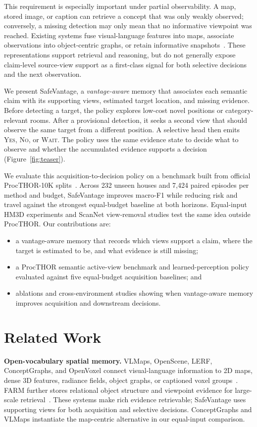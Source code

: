 \documentclass{article}
\newcommand{\method}{SafeVantage}
\begin{document}
This requirement is especially important under partial observability. A map, stored image, or caption can retrieve a concept that was only weakly observed; conversely, a missing detection may only mean that no informative viewpoint was reached. Existing systems fuse visual-language features into maps, associate observations into object-centric graphs, or retain informative snapshots~\citep{huang2023vlmaps,gu2024conceptgraphs,yang2024threedmem}. These representations support retrieval and reasoning, but do not generally expose claim-level source-view support as a first-class signal for both selective decisions and the next observation.

We present \method{}, a \emph{vantage-aware} memory that associates each semantic claim with its supporting views, estimated target location, and missing evidence. Before detecting a target, the policy explores low-cost novel positions or category-relevant rooms. After a provisional detection, it seeks a second view that should observe the same target from a different position. A selective head then emits \textsc{Yes}, \textsc{No}, or \textsc{Wait}. The policy uses the same evidence state to decide what to observe and whether the accumulated evidence supports a decision (Figure~\ref{fig:teaser}).

We evaluate this acquisition-to-decision policy on a benchmark built from official ProcTHOR-10K splits~\citep{deitke2022procthor}. Across 232 unseen houses and 7,424 paired episodes per method and budget, \method{} improves macro-F1 while reducing risk and travel against the strongest equal-budget baseline at both horizons. Equal-input HM3D experiments and ScanNet view-removal studies test the same idea outside ProcTHOR. Our contributions are:
\begin{itemize}
  \item a vantage-aware memory that records which views support a claim, where the target is estimated to be, and what evidence is still missing;
  \item a ProcTHOR semantic active-view benchmark and learned-perception policy evaluated against five equal-budget acquisition baselines; and
  \item ablations and cross-environment studies showing when vantage-aware memory improves acquisition and downstream decisions.
\end{itemize}

\section{Related Work}
\textbf{Open-vocabulary spatial memory.}
VLMaps, OpenScene, LERF, ConceptGraphs, and OpenVoxel connect visual-language information to 2D maps, dense 3D features, radiance fields, object graphs, or captioned voxel groups~\citep{huang2023vlmaps,peng2023openscene,kerr2023lerf,gu2024conceptgraphs,huang2026openvoxel}. FARM further stores relational object structure and viewpoint evidence for large-scale retrieval~\citep{he2026farm}. These systems make rich evidence retrievable; \method{} uses supporting views for both acquisition and selective decisions. ConceptGraphs and VLMaps instantiate the map-centric alternative in our equal-input comparison.
\end{document}
